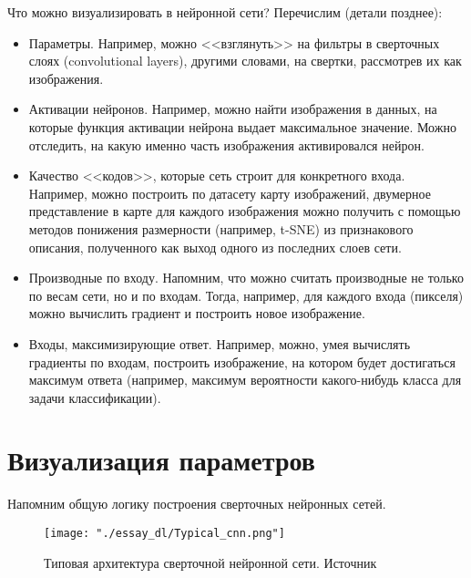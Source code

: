 \documentclass[12pt,fleqn]{article}
\begin{document}
\newpage
Что можно визуализировать в нейронной сети? Перечислим (детали позднее):
\begin{itemize}
\item Параметры. Например, можно <<взглянуть>> на фильтры в сверточных слоях (convolutional layers), другими словами, на свертки, рассмотрев их как изображения.
\item Активации нейронов. Например, можно найти изображения в данных, на которые функция активации нейрона выдает максимальное значение. Можно отследить, на какую именно часть изображения активировался нейрон. 
\item Качество <<кодов>>, которые сеть строит для конкретного входа. Например, можно построить по датасету карту изображений, двумерное представление в карте для каждого изображения можно получить с помощью методов понижения размерности (например, t-SNE) из признакового описания, полученного как выход одного из последних слоев сети.
\item Производные по входу. Напомним, что можно считать производные не только по весам сети, но и по входам. Тогда, например, для каждого входа (пикселя) можно вычислить градиент и построить новое изображение.
\item Входы, максимизирующие ответ. Например, можно, умея вычислять градиенты по входам, построить изображение, на котором будет достигаться максимум ответа (например, максимум вероятности какого-нибудь класса для задачи классификации). 
\end{itemize}

\section{Визуализация параметров}
Напомним общую логику построения сверточных нейронных сетей.

\begin{figure}[H]
\centering
\texttt{[image: "./essay\_dl/Typical\_cnn.png"]}
\caption{Типовая архитектура сверточной нейронной сети. Источник \cite{ConvWiki}}
\end{figure}
\end{document}
